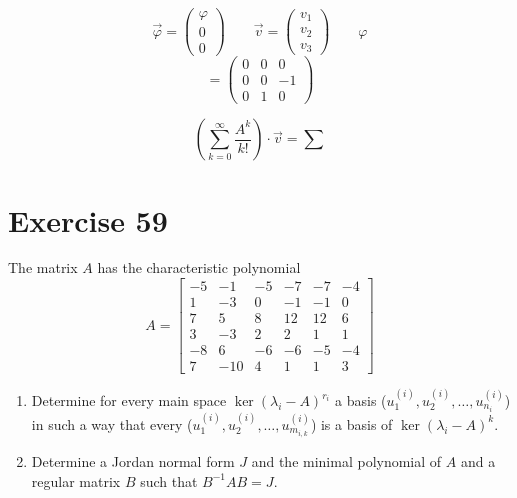 \documentclass[a4paper]{article}
\theoremstyle{definition}
\begin{document}
\[
  \vec\varphi = \begin{pmatrix} \varphi \\ 0 \\ 0 \end{pmatrix} \qquad
  \vec v = \begin{pmatrix} v_1 \\ v_2 \\ v_3 \end{pmatrix} \qquad
  \varphi
\]
\[ = \begin{pmatrix} 0 & 0 & 0 \\ 0 & 0 & -1 \\ 0 & 1 & 0 \end{pmatrix} \]

\[ \left(\sum_{k=0}^\infty \frac{A^k}{k!}\right) \cdot \vec v = \sum \]

\section*{Exercise 59}
\begin{ex}
  The matrix $A$ has the characteristic polynomial
  \[
    A = \begin{bmatrix}
      -5 & -1 & -5 & -7 & -7 & -4 \\
      1 & -3 & 0 & -1 & -1 & 0 \\
      7 & 5 & 8 & 12 & 12 & 6 \\
      3 & -3 & 2 & 2 & 1 & 1 \\
      -8 & 6 & -6 & -6 & -5 & -4 \\
      7 & -10 & 4 & 1 & 1 & 3
    \end{bmatrix}
  \]
  \begin{enumerate}
    \item Determine for every main space $\ker(\lambda_i - A)^{r_i}$ a basis ($u_1^{(i)}, u_2^{(i)}, \dots, u_{n_i}^{(i)}$) in such a way that every ($u_1^{(i)}, u_2^{(i)}, \dots, u_{m_{i,k}}^{(i)}$) is a basis of $\operatorname{ker}(\lambda_i - A)^k$.
    \item Determine a Jordan normal form $J$ and the minimal polynomial of $A$ and a regular matrix $B$ such that $B^{-1}AB = J$.
  \end{enumerate}
\end{ex}
\end{document}
